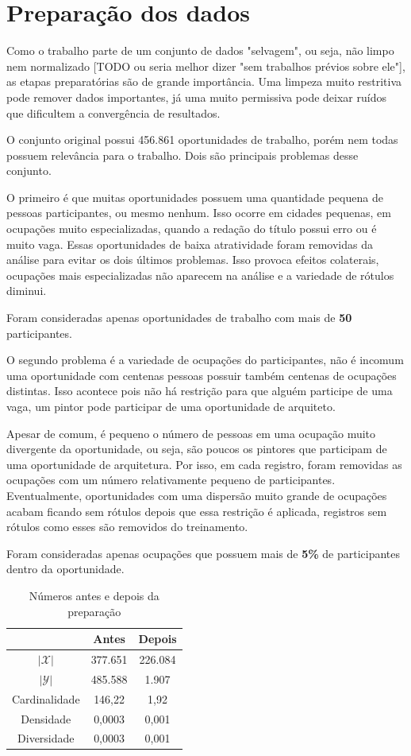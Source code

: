 \documentclass[runningheads,a4paper]{llncs}
\begin{document}
\section{Preparação dos dados} \label{sec:preparacao}

Como o trabalho parte de um conjunto de dados "selvagem", ou seja, não limpo nem normalizado [TODO ou seria melhor dizer "sem trabalhos prévios sobre ele"], as etapas preparatórias são de grande importância. Uma limpeza muito restritiva pode remover dados importantes, já uma muito permissiva pode deixar ruídos que dificultem a convergência de resultados.

O conjunto original possui 456.861 oportunidades de trabalho, porém nem todas possuem relevância para o trabalho. Dois são principais problemas desse conjunto.

O primeiro é que muitas oportunidades possuem uma quantidade pequena de pessoas participantes, ou mesmo nenhum. Isso ocorre em cidades pequenas, em ocupações muito especializadas, quando a redação do título possui erro ou é muito vaga. Essas oportunidades de baixa atratividade foram removidas da análise para evitar os dois últimos problemas. Isso provoca efeitos colaterais, ocupações mais especializadas não aparecem na análise e a variedade de rótulos diminui.

Foram consideradas apenas oportunidades de trabalho com mais de \textbf{50} participantes.

O segundo problema é a variedade de ocupações do participantes, não é incomum uma oportunidade com centenas pessoas possuir também centenas de ocupações distintas. Isso acontece pois não há restrição para que alguém participe de uma vaga, um pintor pode participar de uma oportunidade de arquiteto.

Apesar de comum, é pequeno o número de pessoas em uma ocupação muito divergente da oportunidade, ou seja, são poucos os pintores que participam de uma oportunidade de arquitetura. Por isso, em cada registro, foram removidas as ocupações com um número relativamente pequeno de participantes. Eventualmente, oportunidades com uma dispersão muito grande de ocupações acabam ficando sem rótulos depois que essa restrição é aplicada, registros sem rótulos como esses são removidos do treinamento.

Foram consideradas apenas ocupações que possuem mais de \textbf{5\%} de participantes dentro da oportunidade.

\begin{table}
	\centering
	\begin{tabular}{| c | c | c |}
		\hline
		& \textbf{Antes} & \textbf{Depois} \\
		\hline
		$|\mathcal{X}|$ & 377.651 & 226.084 \\
		\hline
		$|\mathcal{Y}|$ & 485.588 & 1.907 \\
		\hline
		Cardinalidade & 146,22 & 1,92 \\
		\hline
		Densidade & 0,0003 & 0,001 \\
		\hline
		Diversidade & 0,0003 & 0,001 \\
		\hline
	\end{tabular}
	\caption{Números antes e depois da preparação}
	\label{tab:preparacao}
\end{table}
\end{document}
